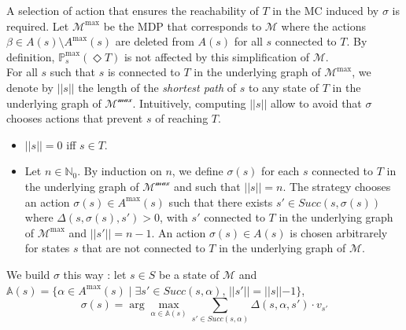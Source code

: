 A selection of action that ensures
the reachability of $T$ in the
MC induced by $\sigma$ is required.
Let $\mathcal{M}^{\max}$ be the MDP that corresponds to $\mathcal{M}$
where the actions $\beta \in A(s) \setminus A^{\max}(s)$ are deleted from $A(s)$
for all $s$ connected to $T$.
By definition, $\mathbb{P}^{\max}_s(\Diamond T)$ is not affected by this simplification of
$\mathcal{M}$. \\

For all $s$ such that $s$ is connected to $T$ in the underlying graph of
$\mathcal{M}^{\max}$, we denote by $||s||$ the length of the \textit{shortest path} of $s$ to any state of $T$ in the underlying graph of
$\mathcal{M^{\max}}$. Intuitively, computing $||s||$ allow to avoid that $\sigma$ chooses
actions that prevent $s$ of reaching $T$.
\begin{itemize}
	\renewcommand{\labelitemi}{\tiny$\bullet$}
	\item $||s|| = 0$ iff $s \in T$.
	\item Let $n \in \mathbb{N}_0$. By induction on $n$, we define
		$\sigma(s)$ for each $s$ connected to $T$ in the underlying graph of
		$\mathcal{M^{\max}}$ and such that $||s|| = n$.
		The strategy chooses an action $\sigma(s) \in A^{\max}(s)$ such that there exists $s' \in Succ(s, \sigma(s))$ where $\Delta(s, \sigma(s), s') > 0$, with $s'$ connected to $T$ in the underlying graph of
		$\mathcal{M}^{\max}$ and $||s'|| = n - 1$. An action $\sigma(s) \in A(s)$ is chosen
		arbitrarely for states $s$ that are not connected to $T$ in the underlying graph of $\mathcal{M}$.
\end{itemize}
We build $\sigma$ this way : let $s \in S$ be a state of $\mathcal{M}$ and $\mathbb{A}(s) = \{\alpha \in A^{\max}(s) \; | \; \exists s' \in Succ(s,
	\alpha), \, ||s'|| = ||s|| - 1 \}$,
\[
	\sigma(s) = \arg \max_{\alpha \in \mathbb{A}(s)} \sum_{s' \in Succ(s, \alpha)} \Delta(s,
	\alpha, s') \cdot v_{s'}
\]

